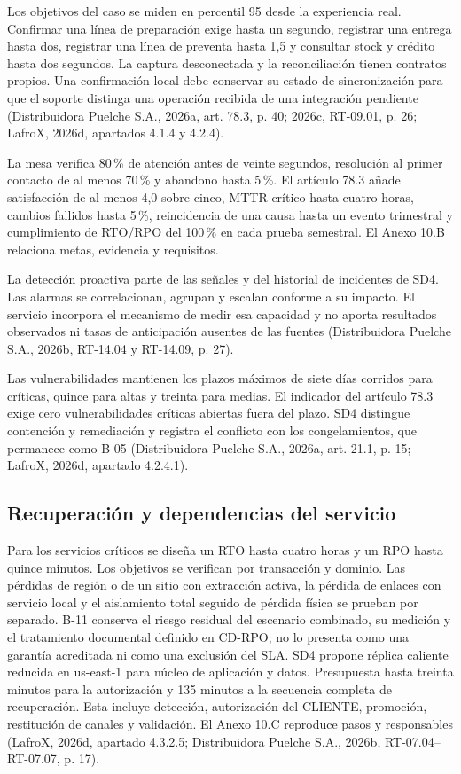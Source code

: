 Los objetivos del caso se miden en percentil 95 desde la experiencia real. Confirmar una línea de preparación exige hasta un segundo, registrar una entrega hasta dos, registrar una línea de preventa hasta 1,5 y consultar stock y crédito hasta dos segundos. La captura desconectada y la reconciliación tienen contratos propios. Una confirmación local debe conservar su estado de sincronización para que el soporte distinga una operación recibida de una integración pendiente (Distribuidora Puelche S.A., 2026a, art. 78.3, p. 40; 2026c, RT-09.01, p. 26; LafroX, 2026d, apartados 4.1.4 y 4.2.4).

La mesa verifica 80\,\% de atención antes de veinte segundos, resolución al primer contacto de al menos 70\,\% y abandono hasta 5\,\%. El artículo 78.3 añade satisfacción de al menos 4,0 sobre cinco, MTTR crítico hasta cuatro horas, cambios fallidos hasta 5\,\%, reincidencia de una causa hasta un evento trimestral y cumplimiento de RTO/RPO del 100\,\% en cada prueba semestral. El Anexo 10.B relaciona metas, evidencia y requisitos.

La detección proactiva parte de las señales y del historial de incidentes de SD4. Las alarmas se correlacionan, agrupan y escalan conforme a su impacto. El servicio incorpora el mecanismo de medir esa capacidad y no aporta resultados observados ni tasas de anticipación ausentes de las fuentes (Distribuidora Puelche S.A., 2026b, RT-14.04 y RT-14.09, p. 27).

Las vulnerabilidades mantienen los plazos máximos de siete días corridos para críticas, quince para altas y treinta para medias. El indicador del artículo 78.3 exige cero vulnerabilidades críticas abiertas fuera del plazo. SD4 distingue contención y remediación y registra el conflicto con los congelamientos, que permanece como B-05 (Distribuidora Puelche S.A., 2026a, art. 21.1, p. 15; LafroX, 2026d, apartado 4.2.4.1).

\subsection{Recuperación y dependencias del servicio}
\label{sub:sd10-continuidad}

Para los servicios críticos se diseña un RTO hasta cuatro horas y un RPO hasta quince minutos. Los objetivos se verifican por transacción y dominio. Las pérdidas de región o de un sitio con extracción activa, la pérdida de enlaces con servicio local y el aislamiento total seguido de pérdida física se prueban por separado. B-11 conserva el riesgo residual del escenario combinado, su medición y el tratamiento documental definido en CD-RPO; no lo presenta como una garantía acreditada ni como una exclusión del SLA. SD4 propone réplica caliente reducida en us-east-1 para núcleo de aplicación y datos. Presupuesta hasta treinta minutos para la autorización y 135 minutos a la secuencia completa de recuperación. Esta incluye detección, autorización del CLIENTE, promoción, restitución de canales y validación. El Anexo 10.C reproduce pasos y responsables (LafroX, 2026d, apartado 4.3.2.5; Distribuidora Puelche S.A., 2026b, RT-07.04--RT-07.07, p. 17).

